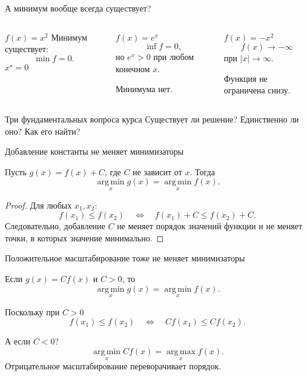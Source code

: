 \documentclass[aspectratio=169,10pt]{beamer}
\newcommand{\argmin}{\operatorname*{arg\,min}}
\newcommand{\argmax}{\operatorname*{arg\,max}}
\begin{document}
\begin{frame}{А минимум вообще всегда существует?}
\begin{columns}[T,onlytextwidth]
\begin{block}{$f(x)=x^2$}
Минимум существует:
\[
\min f=0.
\]
\centering $x^\star=0$
\end{block}
\begin{block}{$f(x)=e^x$}
\[
\inf f=0,
\]
но $e^x>0$ при любом конечном $x$.

\centering Минимума нет.
\end{block}
\begin{block}{$f(x)=-x^2$}
\[
f(x)\to-\infty
\]
при $|x|\to\infty$.

\centering Функция не ограничена снизу.
\end{block}
\end{columns}
\vspace{1em}
\begin{alertblock}{Три фундаментальных вопроса курса}
\centering Существует ли решение? \quad Единственно ли оно? \quad Как его найти?
\end{alertblock}
\end{frame}

\begin{frame}{Добавление константы не меняет минимизаторы}
\begin{theorem}
Пусть $g(x)=f(x)+C$, где $C$ не зависит от $x$. Тогда
\[
  \argmin_x g(x)=\argmin_x f(x).
\]
\end{theorem}
\pause
\begin{proof}
Для любых $x_1,x_2$:
\[
 f(x_1)\le f(x_2)
 \quad\Longleftrightarrow\quad
 f(x_1)+C\le f(x_2)+C.
\]
Следовательно, добавление $C$ не меняет порядок значений функции и не меняет точки, в которых значение минимально.
\end{proof}
\end{frame}

\begin{frame}{Положительное масштабирование тоже не меняет минимизаторы}
\begin{theorem}
Если $g(x)=C f(x)$ и $C>0$, то
\[
  \argmin_x g(x)=\argmin_x f(x).
\]
\end{theorem}
\pause
Поскольку при $C>0$
\[
  f(x_1)\le f(x_2)
  \quad\Longleftrightarrow\quad
  Cf(x_1)\le Cf(x_2).
\]
\vspace{0.6em}
\begin{alertblock}{А если $C<0$?}
\[
  \argmin_x Cf(x)=\argmax_x f(x).
\]
Отрицательное масштабирование переворачивает порядок.
\end{alertblock}
\end{frame}
\end{document}
